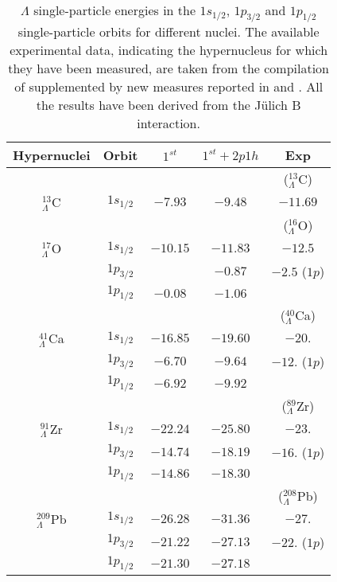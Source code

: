 \begin{table}
\caption{ $\Lambda$ single-particle energies in the $1 s_{1/2}$, $1
p_{3/2}$ and
 $1 p_{1/2}$ single-particle orbits 
  for different
nuclei. The available experimental data, indicating the hypernucleus for which they have been
measured, are taken from the compilation of \protect\cite{bando90} supplemented by new measures reported
in \protect\cite{pile91} and \protect\cite{hase96}. All the results have been derived from the J\"ulich 
B interaction.}
\bigskip
\bigskip
\begin{tabular}{ c | c c c c  }
Hypernuclei \phantom{caca}& Orbit & $1^{st}$ & $1^{st}+2p1h$ &  Exp{}
\\ %
\hline
&&&&($^{13}_{\Lambda}$C) \\
$^{13}_{\Lambda}$C \phantom{cac}& $1 s_{1/2}$ & $-7.93$ & $-9.48$ & $-11.69$  {}\\
\hline
&&&&($^{16}_{\Lambda}$O){}\\
$^{17}_{\Lambda}$O \phantom{cac}& $1 s_{1/2}$ & $-10.15$ & $-11.83$ & $-12.5$ {}\\
 & $1 p_{3/2}$ &       & $-0.87$ & $-2.5$ ($1p$){}\\
 & $1 p_{1/2}$ & $-0.08$ & $-1.06$ & \\
\hline
&&&&($^{40}_{\Lambda}$Ca){}\\
$^{41}_{\Lambda}$Ca \phantom{cac}& $1 s_{1/2}$ & $-16.85$ & $-19.60$ & $-20.$ {}\\
 & $1 p_{3/2}$ & $-6.70$      & $-9.64$ & $-12.$ ($1p$){}\\
 & $1 p_{1/2}$ & $-6.92$ & $-9.92$ & {}\\
\hline
&&&&($^{89}_{\Lambda}$Zr) \\
$^{91}_{\Lambda}$Zr \phantom{cac}& $1 s_{1/2}$ & $-22.24$ & $-25.80$ & $-23.$ {}\\
 & $1 p_{3/2}$ & $-14.74$      & $-18.19$ & $-16.$ ($1p$){}\\
 & $1 p_{1/2}$ & $-14.86$ & $-18.30$ & {}\\
\hline
&&&&($^{208}_{\Lambda}$Pb) \\
$^{209}_{\Lambda}$Pb \phantom{cac}& $1 s_{1/2}$ & $-26.28$ & $-31.36$ & $-27.$ {}\\
 & $1 p_{3/2}$ & $-21.22$      & $-27.13$  & $-22.$ ($1p$) {}\\
 & $1 p_{1/2}$ & $-21.30$ & $-27.18$ &{}\\
\end{tabular}
\label{tab:ener}
\end{table}




